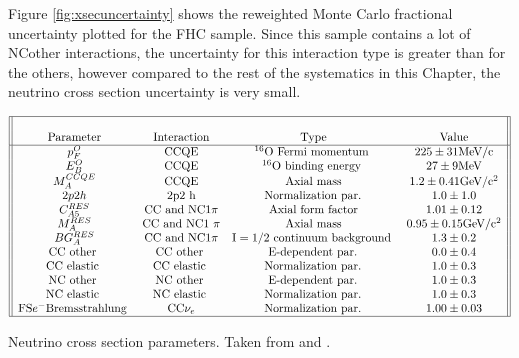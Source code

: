 Figure \ref{fig:xsecuncertainty} shows the reweighted Monte Carlo fractional uncertainty plotted for the FHC sample. Since this sample contains a lot of NCother interactions, the uncertainty for this interaction type is greater than for the others, however compared to the rest of the systematics in this Chapter, the neutrino cross section uncertainty is very small.

\begin{table}
    \centering
        $\begin{array}{||cccc||}
        \hline & & & \\
        \text { Parameter } & \text { Interaction } & \text { Type } & \text { Value } \\
        \hline
        p_{F}^{O} & \text{CCQE} & { }^{16} \text{O} \text { Fermi momentum } & 225 \pm 31 \text{MeV} / \text{c} \\
        E_{B}^{O} & \text{CCQE} & { }^{16} \text{O} \text { binding energy } & 27 \pm 9 \text{MeV} \\
        M_{A}^{C C Q E} & \text{CCQE} & \text { Axial mass } & 1.2 \pm 0.41 \text{GeV} / \text{c}^{2}\\
        2 p 2 h & 2 \text{p} 2 \text{~h} & \text { Normalization par. } & 1.0 \pm 1.0 \\
        C_{A 5}^{R E S}& \text{CC} \text { and } \text{NC} 1 \pi & \text { Axial form factor } & 1.01 \pm 0.12 \\
        M_{A}^{R E S}  & \text{CC} \text { and NC1 } \pi & \text { Axial mass } & 0.95 \pm 0.15 \text{GeV} / \text{c}^{2} \\
        B G_{A}^{R E S} & \text{CC} \text { and } \text{NC} 1 \pi & \text{I}=1 / 2 \text { continuum background } & 1.3 \pm 0.2 \\
        \text{CC} \text { other } & \text{CC} \text { other } & \text { E-dependent par. } & 0.0 \pm 0.4 \\
        \text{CC} \text { elastic } & \text{CC} \text { elastic } & \text { Normalization par. } & 1.0 \pm 0.3 \\
        \text{NC} \text { other } & \text{NC} \text { other } & \text { E-dependent par. } & 1.0 \pm 0.3 \\
        \text{NC} \text { elastic } & \text{NC} \text {  elastic } & \text { Normalization par. } & 1.0 \pm 0.3 \\
        \text{FS} e^{-} \text {Bremsstrahlung } & \text{CC} \nu_{e} & \text { Normalization par. } & 1.00 \pm 0.03 \\
        \hline
        \end{array}$
        \caption{Neutrino cross section parameters. Taken from \cite{nu_xsec} and \cite{NIWG_xsec}.}
        \label{table:xsectable}
\end{table}


